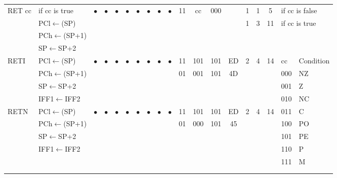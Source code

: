 \documentclass[oneside,a4paper]{book}
\begin{document}
{\begin{tabular}{llc@{ }c@{ }c@{ }c@{ }c@{ }c@{ }c@{ }cc@{ }c@{ }cccccll}
RET cc & if cc is true &
	$\bullet$ & $\bullet$ & $\bullet$ & $\bullet$ & $\bullet$ & $\bullet$ & $\bullet$ & $\bullet$ & 11 & cc & 000
	&  & 1 & 1 & 5 & \multicolumn{2}{l}{if cc is false} \\
	& PCl$\leftarrow$(SP) & \multicolumn{8}{c}{} & \multicolumn{3}{c}{} & & 1 & 3 & 11 & \multicolumn{2}{l}{if cc is true} \\ 
	& PCh$\leftarrow$(SP+1) & \multicolumn{8}{c}{} & \multicolumn{3}{c}{} & & & &  &  & \\
	& SP$\leftarrow$SP+2 & \multicolumn{8}{c}{} & \multicolumn{3}{c}{} & & & &  &  & \\

RETI\footnotemark[1] & PCl$\leftarrow$(SP) &
	$\bullet$ & $\bullet$ & $\bullet$ & $\bullet$ & $\bullet$ & $\bullet$ & $\bullet$ & $\bullet$ & 11 & 101 & 101 
	& ED & 2 & 4 & 14 & cc & Condition \\ \cline{18-19}
	& PCh$\leftarrow$(SP+1) & \multicolumn{8}{c}{} & 01 & 001 & 101 & 4D & & & & 000 & NZ \\
	& SP$\leftarrow$SP+2 & \multicolumn{8}{c}{} & \multicolumn{3}{c}{} & & & &  & 001 & Z \\
	& IFF1$\leftarrow$IFF2 & \multicolumn{8}{c}{} & \multicolumn{3}{c}{} & & & &  & 010 & NC \\

RETN\footnotemark[2] & PCl$\leftarrow$(SP) &
	$\bullet$ & $\bullet$ & $\bullet$ & $\bullet$ & $\bullet$ & $\bullet$ & $\bullet$ & $\bullet$ & 11 & 101 & 101 
	& ED & 2 & 4 & 14 & 011 & C \\
	& PCh$\leftarrow$(SP+1) & \multicolumn{8}{c}{} & 01 & 000 & 101 & 45 & & & & 100 & PO \\
	& SP$\leftarrow$SP+2 & \multicolumn{8}{c}{} & \multicolumn{3}{c}{} & & & &  & 101 & PE \\
	& IFF1$\leftarrow$IFF2 & \multicolumn{8}{c}{} & \multicolumn{3}{c}{} & & & &  & 110 & P \\
	& & \multicolumn{8}{c}{} & \multicolumn{3}{c}{} & & & &  & 111 & M \\
	& & \multicolumn{8}{c}{} & \multicolumn{3}{c}{} & & & &  & & \\
	& & \multicolumn{8}{c}{} & \multicolumn{3}{c}{} & & & &  & & \\


\end{tabular}}
\end{document}
